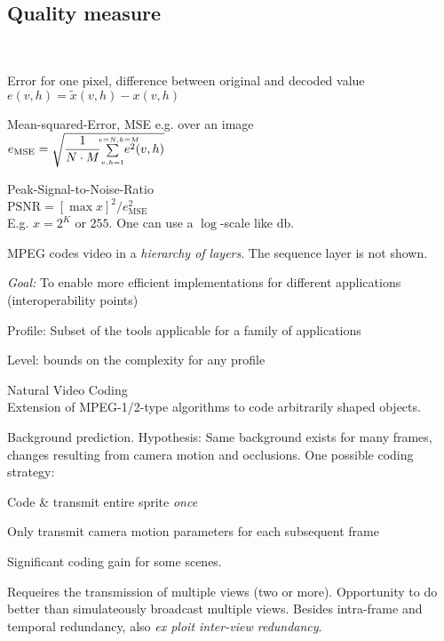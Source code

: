 \begin{compactdesc}
\section{Quality measure}
	\item[\lp{objective: PSNR}] \hfill\\
		\begin{itemize*}[label=\colorbullet]
			\item Error for one pixel, difference between original and decoded value\\
				$e(v,h)=\tilde{x}(v,h)-x(v,h)$\\
		\item Mean-squared-Error, MSE e.g. over an image\\
			$\ds e_{\text{MSE}}=\sqrt{\frac{1}{N\cdot M}{\scriptstyle\sum\limits_{v,h=1}^{\mathclap{\quad v=N,h=M}}}e^2(v,h)}$
		\item Peak-Signal-to-Noise-Ratio\\
			$\text{PSNR}=[\max x]^2/e_{\text{MSE}}^{2}$\\
			E.g. $x=2^K$ or $255$. One can use a $\log$-scale like $\si{\decibel}$.
		\end{itemize*}
	\item[\lp{MPEG Structure}] MPEG codes video in a \emph{hierarchy of layers}. The sequence layer is not shown.
	\item[\lp{MPEG-2}] \emph{Goal:} To enable more efficient implementations for different applications (interoperability points)\\
		\begin{itemize*}[label=\colorbullet]
			\item Profile: Subset of the tools applicable for a family of applications\\
			\item Level: bounds on the complexity for any profile
		\end{itemize*}
	\item[\lp{MPEG-4}] Natural Video Coding\\
		Extension of MPEG-1/2-type algorithms to code arbitrarily shaped objects.
	\item[\lp{Sprite Coding}] Background prediction. Hypothesis: Same background exists for many frames, changes resulting from camera motion and occlusions. One possible coding strategy:\\
		\begin{enumerate*}[label=\protect\circled{\arabic*},itemjoin=]
			\item Code \& transmit entire sprite \emph{once}\\
			\item Only transmit camera motion parameters for each subsequent frame
		\end{enumerate*}
		Significant coding gain for some scenes.
	\item[\lp{3D TV}] Requeires the transmission of multiple views (two or more). Opportunity to do better than simulateously broadcast multiple views. Besides intra-frame and temporal redundancy, also \emph{ex ploit inter-view redundancy}.
\end{compactdesc}
